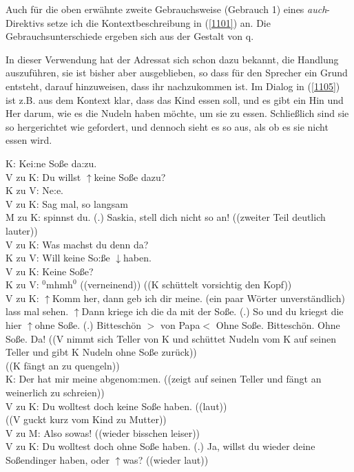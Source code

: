 {Auch für die oben erwähnte zweite Gebrauchsweise (Gebrauch 1) eines \textit{auch}-Direktivs setze ich die Kontextbeschreibung in (\ref{1101}) an. Die Gebrauchsunterschiede ergeben sich aus der Gestalt von q. 

In dieser Verwendung hat der Adressat sich schon dazu bekannt, die Handlung auszuführen, sie ist bisher aber ausgeblieben, so dass für den Sprecher ein Grund entsteht, darauf hinzuweisen, dass ihr nachzukommen ist. Im Dialog in (\ref{1105}) ist z.B. aus dem Kontext klar, dass das Kind essen soll, und es gibt ein Hin und Her darum, wie es die Nudeln haben möchte, um sie zu essen. Schließlich sind sie so hergerichtet wie gefordert, und dennoch sieht es so aus, als ob es sie nicht essen wird.

\begin{exe}
	\ex\label{1105} 
	\scriptsize
 	K: Kei:ne Soße da:zu.\\
	V zu K: Du willst $\uparrow$keine Soße dazu?\\
	K zu V: Ne:e.\\
	V zu K: Sag mal, so langsam\\
	M zu K: spinnst du. (.) Saskia, stell dich nicht so an! ((zweiter Teil deutlich lauter))\\
	V zu K: Was machst du denn da?\\
	K zu V: Will keine So:ße $\downarrow$haben.\\
	V zu K: Keine Soße?\\
	K zu V: $^{0}\textrm{mhmh}^{0}$ ((verneinend)) ((K schüttelt vorsichtig den Kopf))\\
	V zu K: $\uparrow$Komm her, dann geb ich dir meine. (ein paar Wörter unverständlich) lass mal sehen. $\uparrow$Dann kriege ich die da mit der Soße. (.) 	So und du kriegst die hier $\uparrow$ohne Soße. (.) Bitteschön $>$ von Papa$<$ Ohne Soße. Bitteschön. Ohne Soße. Da! ((V nimmt sich Teller von K und 		schüttet Nudeln vom K auf seinen Teller und gibt K Nudeln ohne Soße zurück))\\
	((K fängt an zu quengeln))\\
	K: Der hat mir meine abgenom:men. ((zeigt auf seinen Teller und fängt an weinerlich zu schreien))\\
	V zu K: Du wolltest doch keine Soße haben. ((laut))\\
	((V guckt kurz vom Kind zu Mutter))\\
	V zu M: Also sowas! ((wieder bisschen leiser))\\
	V zu K: Du wolltest doch ohne Soße haben. (.) Ja, willst du wieder deine Soßendinger haben, oder $\uparrow$was? ((wieder laut))\\

\end{exe}}
